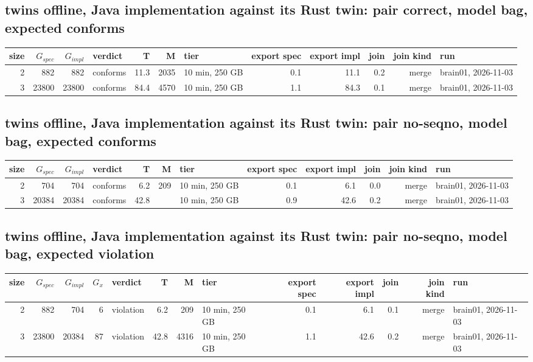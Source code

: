 \documentclass[10pt]{article}
\begin{document}
\subsection*{twins offline, Java implementation against its Rust twin: pair \textsf{correct}, model bag, expected conforms}
\begin{longtable}{@{}rrrlrrlrrrrl@{}}
\toprule
size & $G_{\mathit{spec}}$ & $G_{\mathit{impl}}$ & verdict & T & M & tier & export spec & export impl & join & join kind & run \\
\midrule
\endhead
\color{blue} 2 & 882 & 882 & conforms & 11.3 & 2035 & 10 min, 250 GB & 0.1 & 11.1 & 0.2 & merge & brain01, 2026-11-03 \\
\color{blue} 3 & 23800 & 23800 & conforms & 84.4 & 4570 & 10 min, 250 GB & 1.1 & 84.3 & 0.1 & merge & brain01, 2026-11-03 \\
\bottomrule
\end{longtable}
\subsection*{twins offline, Java implementation against its Rust twin: pair \textsf{no-seqno}, model bag, expected conforms}
\begin{longtable}{@{}rrrlrrlrrrrl@{}}
\toprule
size & $G_{\mathit{spec}}$ & $G_{\mathit{impl}}$ & verdict & T & M & tier & export spec & export impl & join & join kind & run \\
\midrule
\endhead
\color{blue} 2 & 704 & 704 & conforms & 6.2 & 209 & 10 min, 250 GB & 0.1 & 6.1 & 0.0 & merge & brain01, 2026-11-03 \\
\color{blue} 3 & 20384 & 20384 & conforms & 42.8 &  & 10 min, 250 GB & 0.9 & 42.6 & 0.2 & merge & brain01, 2026-11-03 \\
\bottomrule
\end{longtable}
\subsection*{twins offline, Java implementation against its Rust twin: pair \textsf{no-seqno}, model bag, expected violation}
\begin{longtable}{@{}rrrrlrrlrrrrl@{}}
\toprule
size & $G_{\mathit{spec}}$ & $G_{\mathit{impl}}$ & $G_x$ & verdict & T & M & tier & export spec & export impl & join & join kind & run \\
\midrule
\endhead
\color{blue} 2 & 882 & 704 & 6 & violation & 6.2 & 209 & 10 min, 250 GB & 0.1 & 6.1 & 0.1 & merge & brain01, 2026-11-03 \\
\color{blue} 3 & 23800 & 20384 & 87 & violation & 42.8 & 4316 & 10 min, 250 GB & 1.1 & 42.6 & 0.2 & merge & brain01, 2026-11-03 \\
\bottomrule
\end{longtable}
\end{document}
